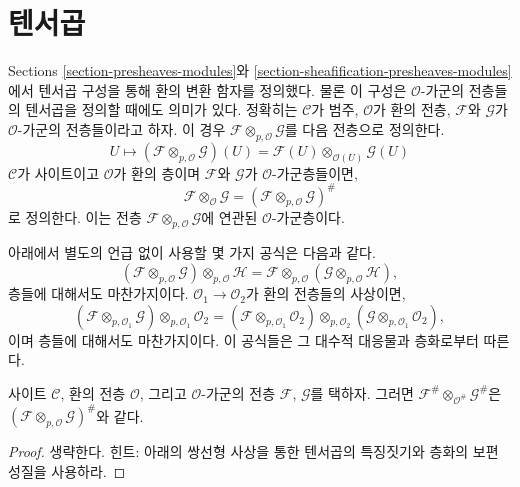 \section{텐서곱}
\label{section-tensor-product}

\noindent
Sections \ref{section-presheaves-modules}와
\ref{section-sheafification-presheaves-modules}에서 텐서곱 구성을 통해 환의
변환 함자를 정의했다. 물론 이 구성은 $\mathcal{O}$-가군의 전층들의
텐서곱을 정의할 때에도 의미가 있다. 정확히는 $\mathcal{C}$가 범주,
$\mathcal{O}$가 환의 전층, $\mathcal{F}$와 $\mathcal{G}$가
$\mathcal{O}$-가군의 전층들이라고 하자. 이 경우
$\mathcal{F} \otimes_{p, \mathcal{O}} \mathcal{G}$를 다음 전층으로 정의한다.
$$
U
\longmapsto
(\mathcal{F} \otimes_{p, \mathcal{O}} \mathcal{G})(U)
=
\mathcal{F}(U) \otimes_{\mathcal{O}(U)} \mathcal{G}(U)
$$
$\mathcal{C}$가 사이트이고 $\mathcal{O}$가 환의 층이며
$\mathcal{F}$와 $\mathcal{G}$가 $\mathcal{O}$-가군층들이면,
$$
\mathcal{F} \otimes_\mathcal{O} \mathcal{G}
=
(\mathcal{F} \otimes_{p, \mathcal{O}} \mathcal{G})^\#
$$
로 정의한다. 이는 전층
$\mathcal{F} \otimes_{p, \mathcal{O}} \mathcal{G}$에 연관된
$\mathcal{O}$-가군층이다.

\medskip\noindent
아래에서 별도의 언급 없이 사용할 몇 가지 공식은 다음과 같다.
$$
(\mathcal{F}
\otimes_{p, \mathcal{O}} \mathcal{G})
\otimes_{p, \mathcal{O}} \mathcal{H}
=
\mathcal{F}
\otimes_{p, \mathcal{O}} (\mathcal{G}
\otimes_{p, \mathcal{O}} \mathcal{H}),
$$
층들에 대해서도 마찬가지이다. $\mathcal{O}_1 \to \mathcal{O}_2$가 환의
전층들의 사상이면,
$$
(\mathcal{F} \otimes_{p, \mathcal{O}_1} \mathcal{G})
\otimes_{p, \mathcal{O}_1} \mathcal{O}_2 =
(\mathcal{F} \otimes_{p, \mathcal{O}_1} \mathcal{O}_2)
\otimes_{p, \mathcal{O}_2}
(\mathcal{G} \otimes_{p, \mathcal{O}_1} \mathcal{O}_2),
$$
이며 층들에 대해서도 마찬가지이다. 이 공식들은 그 대수적 대응물과
층화로부터 따른다.

\begin{lemma}
\label{lemma-sheafification-tensor}
사이트 $\mathcal{C}$, 환의 전층 $\mathcal{O}$, 그리고
$\mathcal{O}$-가군의 전층 $\mathcal{F}$, $\mathcal{G}$를 택하자. 그러면
$\mathcal{F}^\# \otimes_{\mathcal{O}^\#} \mathcal{G}^\#$은
$(\mathcal{F} \otimes_{p, \mathcal{O}} \mathcal{G})^\#$와 같다.
\end{lemma}

\begin{proof}
생략한다. 힌트: 아래의 쌍선형 사상을 통한 텐서곱의 특징짓기와 층화의
보편 성질을 사용하라.
\end{proof}

